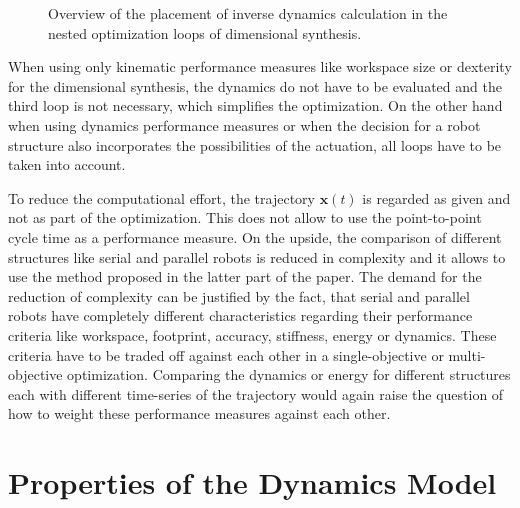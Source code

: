 \documentclass{svproc}
\newcommand{\bm}[1]{\boldsymbol{#1}}
\begin{document}
\begin{figure}[tb]
    
    \caption{Overview of the placement of inverse dynamics calculation in the nested optimization loops of dimensional synthesis.}
    \label{fig:dimsynth_dyn_std}
\end{figure} 

When using only kinematic performance measures like workspace size or dexterity for the dimensional synthesis, the dynamics do not have to be evaluated and the third loop is not necessary, which simplifies the optimization.
On the other hand when using dynamics performance measures or when the decision for a robot structure also incorporates the possibilities of the actuation, all loops have to be taken into account.

To reduce the computational effort, the trajectory $\bm{x}(t)$ is regarded as given and not as part of the optimization.
This does not allow to use the point-to-point cycle time as a performance measure.
On the upside, the comparison of different structures like serial and parallel robots is reduced in complexity and it allows to use the method proposed in the latter part of the paper.
The demand for the reduction of complexity can be justified by the fact, that serial and parallel robots have completely different characteristics regarding their performance criteria like workspace, footprint, accuracy, stiffness, energy or dynamics.
These criteria have to be traded off against each other in a single-objective or multi-objective optimization.
Comparing the dynamics or energy for different structures each with different time-series of the trajectory would again raise the question of how to weight these performance measures against each other.


\section{Properties of the Dynamics Model}
\label{sec:DynMdl}
\end{document}
